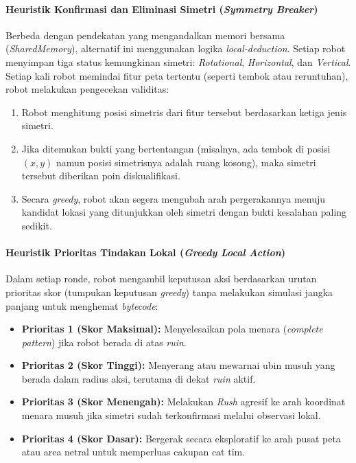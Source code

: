 \paragraph{Heuristik Konfirmasi dan Eliminasi Simetri (\textit{Symmetry Breaker})}
Berbeda dengan pendekatan yang mengandalkan memori bersama (\textit{SharedMemory}), alternatif ini menggunakan logika \textit{local-deduction}. Setiap robot menyimpan tiga status kemungkinan simetri: \textit{Rotational}, \textit{Horizontal}, dan \textit{Vertical}. Setiap kali robot memindai fitur peta tertentu (seperti tembok atau reruntuhan), robot melakukan pengecekan validitas:
\begin{enumerate}
    \item Robot menghitung posisi simetris dari fitur tersebut berdasarkan ketiga jenis simetri.
    \item Jika ditemukan bukti yang bertentangan (misalnya, ada tembok di posisi $(x, y)$ namun posisi simetrisnya adalah ruang kosong), maka simetri tersebut diberikan poin diskualifikasi.
    \item Secara \textit{greedy}, robot akan segera mengubah arah pergerakannya menuju kandidat lokasi yang ditunjukkan oleh simetri dengan bukti kesalahan paling sedikit.
\end{enumerate}

\paragraph{Heuristik Prioritas Tindakan Lokal (\textit{Greedy Local Action})}
Dalam setiap ronde, robot mengambil keputusan aksi berdasarkan urutan prioritas skor (tumpukan keputusan \textit{greedy}) tanpa melakukan simulasi jangka panjang untuk menghemat \textit{bytecode}:
\begin{itemize}
    \item \textbf{Prioritas 1 (Skor Maksimal):} Menyelesaikan pola menara (\textit{complete pattern}) jika robot berada di atas \textit{ruin}.
    \item \textbf{Prioritas 2 (Skor Tinggi):} Menyerang atau mewarnai ubin musuh yang berada dalam radius aksi, terutama di dekat \textit{ruin} aktif.
    \item \textbf{Prioritas 3 (Skor Menengah):} Melakukan \textit{Rush} agresif ke arah koordinat menara musuh jika simetri sudah terkonfirmasi melalui observasi lokal.
    \item \textbf{Prioritas 4 (Skor Dasar):} Bergerak secara eksploratif ke arah pusat peta atau area netral untuk memperluas cakupan cat tim.
\end{itemize}


